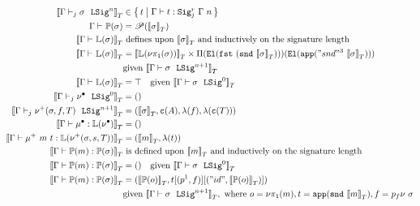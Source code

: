 \begin{align*}
  \denotesT{\goodSigU{j}{\Gamma}{\lsig}{n}} &\in \setc{t}{ \goodTerm{\Gm}{t}{\Sigr{\Gm}{n}{j}} } \\
  {\goodType{\Gamma}{\TyTkg{\lsig}}{}} &= \mathscr{P}(\denotesT{\lsig}) \\
  \denotesT{\goodType{\Gamma}{\TyLkg{\sigma}}{}} &\text{ defines upon } \denotesT{\lsig} 
  \text{ and inductively on the signature length} \\
  \denotesT{\goodType{\Gamma}{\TyLkg{\sigma}}{}} &=
  \denotesT{\TyLkg{\lsigproj{1}{\sigma}}} \times \Pi(\El{\fst{(\snd{\denotesT{\sigma}})}})(\El{\app{"snd"^3~\denotesT{\sigma}}}) \\
  &\text{given } \denotesT{\goodSig{\Gamma}{\sigma}{n+1}} \\
  \denotesT{\goodType{\Gamma}{\TyLkg{\sigma}}{}} &= \top \quad
  \text{given } \denotesT{\goodSig{\Gamma}{\sigma}{0}} \\
  \denotesT{\goodSigU{j}{\Gamma}{\LSigEmp}{0}} &= \unit \\
  \denotesT{\goodSigU{j}{\Gamma}{\LSigAdd{\sigma}{f}{T}}{n+1}} &= (\denotesT{\sigma}, \codety{A}, \lam{f}, \lam{\codety{T}}) \\
  \denotesT{\goodTerm{\Gamma}{\LkgEmp}{\TyLkg{\LSigEmp}}} &= \unit \\
  \denotesT{\goodTerm{\Gamma}{\mu^+~m~t}{\TyLkg{\LSigAdd{\sigma}{s}{T}}}} &= (\denotesT{m}, \lam{t}) \\
  \denotesT{\goodTerm{\Gamma}{\Tkg{m}}{\TyTkg {\sigma}}} & \text{ is defined upon } \denotesT{m} \text{ and inductively on the signature length} \\
  \denotesT{\goodTerm{\Gamma}{\Tkg {m}}{\TyTkg {\sigma}}} &= () \quad \text{given } \denotesT{\goodSig{\Gamma}{\sigma}{0}} \\
  \denotesT{\goodTerm{\Gamma}{\Tkg {m}}{\TyTkg {\sigma}}} &= 
  (\denotesT{\Tkg {o}}, t[(\SubstExt{p^1}{f})][(\SubstExt{"id"}{\denotesT{\Tkg {o}}})]) \\
  & \text{given } \denotesT{\goodSig{\Gamma}{\sigma}{n+1}}, \text{ where } o = \lsigproj{1}{m}, t = \app{\snd{\denotesT{m}}}, f = p_f\nu~\sigma 
\end{align*}



